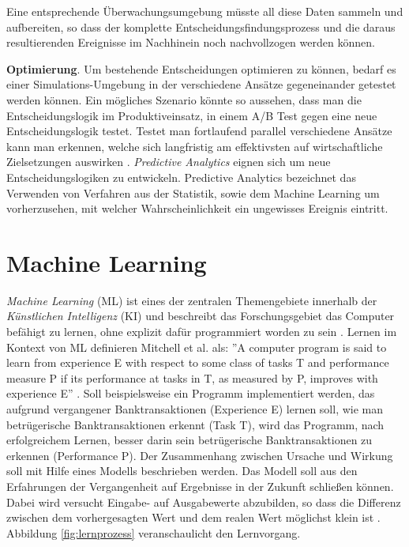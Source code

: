 Eine entsprechende Überwachungsumgebung müsste all diese Daten sammeln und aufbereiten, so dass der komplette Entscheidungsfindungsprozess und die daraus resultierenden Ereignisse im Nachhinein noch nachvollzogen werden können.

\textbf{Optimierung}. Um bestehende Entscheidungen optimieren zu können, bedarf es einer Simulations-Umgebung in der verschiedene Ansätze gegeneinander getestet werden können. Ein mögliches Szenario könnte so aussehen, dass man die Entscheidungslogik im Produktiveinsatz, in einem A/B Test gegen eine neue Entscheidungslogik testet. Testet man fortlaufend parallel verschiedene Ansätze kann man erkennen, welche sich langfristig am effektivsten auf wirtschaftliche Zielsetzungen auswirken \cite[vgl. S. 173]{JT11}. \emph{Predictive Analytics} eignen sich um neue Entscheidungslogiken zu entwickeln. Predictive Analytics bezeichnet \cite[vgl. S. 5]{BG15} das Verwenden von Verfahren aus der Statistik, sowie dem Machine Learning um vorherzusehen, mit welcher Wahrscheinlichkeit ein ungewisses Ereignis eintritt.   
  
\section{Machine Learning}
\label{sec:Machine_Learning2}

\emph{Machine Learning} (ML) ist eines der zentralen Themengebiete innerhalb der  \emph{Künstlichen Intelligenz} (KI) \cite[vgl. S. 2082]{JW12} und beschreibt das Forschungsgebiet das Computer befähigt zu lernen, ohne explizit dafür programmiert worden zu sein \cite[vgl. S. 1]{AM14}. Lernen im Kontext von ML definieren Mitchell et al. als: ''A computer program is said to learn from experience E with respect to some class of tasks T and performance measure P if its performance at tasks in T, as measured by P, improves with experience E'' \cite{MT97}. Soll beispielsweise ein Programm implementiert werden, das aufgrund vergangener Banktransaktionen (Experience E) lernen soll, wie man betrügerische Banktransaktionen erkennt (Task T), wird das Programm, nach erfolgreichem Lernen, besser darin sein betrügerische Banktransaktionen zu erkennen (Performance P). Der Zusammenhang zwischen Ursache und Wirkung soll mit Hilfe eines Modells beschrieben werden. Das Modell soll aus den Erfahrungen der Vergangenheit auf Ergebnisse in der Zukunft schließen können. Dabei wird versucht Eingabe- auf Ausgabewerte abzubilden, so dass die Differenz zwischen dem vorhergesagten Wert und dem realen Wert möglichst klein ist \cite[vgl. S. 68]{EM17}. Abbildung \ref{fig:lernprozess} veranschaulicht den Lernvorgang.   

